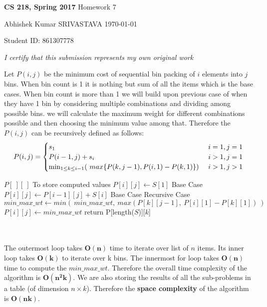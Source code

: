 \documentclass[a4paper,11pt]{article}
\renewcommand{\maketitle}{%
	
	\Large
 	\textbf{CS 218, Spring 2017}
 	\hfill
 	Homework 7
 	\par
 	
	\Large
	Abhishek Kumar SRIVASTAVA
	\hfill
	\normalsize
	\today
 	\par
 	Student ID: 861307778
 	\par
 	
 	\begin{center}

 	\vspace{.2in}
 	
 	\textit{I certify that this submission represents my own original work }
 	\par
	\vspace{.2in}
	\makebox[2.4in]{\hrulefill}
	\par

 	\end{center}
 	
 	\hrulefill
 	\par \vspace{2ex}
 	}
\theoremstyle{quest}
\newenvironment{solution}[2][Solution]{\begin{trivlist}
		\item[\hskip \labelsep {\bfseries #1}\hskip \labelsep {\bfseries #2.}]}{\end{trivlist}}
\begin{document}
\thispagestyle{empty}
	
\maketitle

\begin{solution}1 Let $P(i,j)$ be the minimum cost of sequential bin packing of $i$ elements into $j$ bins. When bin count is 1 it is nothing but sum of all the items which is the base cases. When bin count is more than 1 we will build upon previous case of when they have 1 bin by considering multiple combinations and dividing among possible bins. we will calculate the maximum weight for different combinations possible and then choosing the minimum value among that. Therefore the $P(i,j)$ can be recursively defined as follows:
\begin{align*}
P(i,j) =
\begin{cases} 
s_1 \hfill & \text{ $i = 1,j=1$ } \\
P(i-1,j) + s_i \hfill & \text{ $i>1,j=1$ } \\
\hfill \min_{1\le k\le i-1} (~max\{P(k,j-1),P(i,1)-P(k,1) \}) \hfill & \text{ $i>1,j>1$ }
\end{cases}
\end{align*}
\begin{algorithm}
	\caption{}
	\label{Algorithm}
	\begin{algorithmic}
		\State $P[~][~]$
		\Comment To store computed values
		\State $P[i][j] \gets S[1]$ \Comment Base Case
		\Else
		\State $P[i][j] \gets P[i-1][j] + S[i]$ \Comment Base Case
		\EndIf
		\Else
		 \Comment Recursive Case
		\State $min\_max\_wt \gets min(~min\_max\_wt,~max(P[k][j-1],~P[i][1] - P[k][1])~)$
		\EndFor
		\State $P[i][j] \gets min\_max\_wt$
		\EndIf
		\EndFor
		\EndFor
		\State return P[length($S$)][$k$]
		\EndFunction	
	\end{algorithmic} 
\end{algorithm}\\\\
The outermost loop takes $\mathbf{O(n)}$ time to iterate over list of $n$ items. Its inner loop takes $\mathbf{O(k)}$ to iterate over k bins. The innermost for loop takes $\mathbf{O(n)}$ time to compute the $min\_max\_wt$. Therefore the overall time complexity of the algorithm is $\mathbf{O(n^2k)}$. We are also storing the results of all the sub-problems in a table (of dimension $n\times k$). Therefore the \textbf{space complexity} of the algorithm is $\mathbf{O(nk)}$.	
\end{solution}
\end{document}
